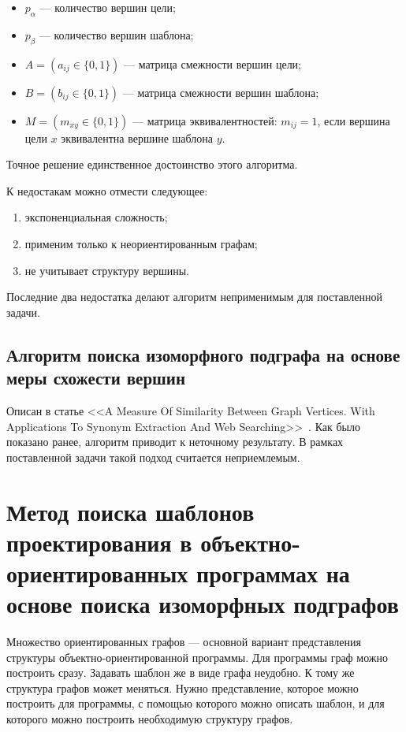 \begin{itemize}
\item $p_\alpha$ --- количество вершин цели;
\item $p_\beta$ --- количество вершин шаблона;
\item $A = (a_{ij} \in \{ 0, 1 \})$ --- матрица смежности вершин цели;
\item $B = (b_{ij} \in \{ 0, 1 \})$ --- матрица смежности вершин шаблона;
\item $M = (m_{xy} \in \{ 0, 1 \})$ --- матрица эквивалентностей: $m_{ij} = 1$,
если вершина цели $x$ эквивалентна вершине шаблона $y$.
\end{itemize}

Точное решение единственное достоинство этого алгоритма.

К недостакам можно отмести следующее:
\begin{enumerate}
\item экспоненциальная сложность;
\item применим только к неориентированным графам;
\item не учитывает структуру вершины.
\end{enumerate}

Последние два недостатка делают алгоритм неприменимым для поставленной задачи.

\subsection{Алгоритм поиска изоморфного подграфа на основе меры схожести вершин}

Описан в статье <<A Measure Of Similarity Between Graph Vertices.
With Applications To Synonym Extraction And Web Searching>>~\cite{SimilarityGraphVertices}.
Как было показано ранее, алгоритм приводит к неточному результату.
В рамках поставленной задачи такой подход считается неприемлемым.

\section{Метод поиска шаблонов проектирования в объектно-ориентированных программах на основе поиска изоморфных подграфов}

Множество ориентированных графов --- основной вариант представления структуры
объектно-ориентированной программы.
Для программы граф можно построить сразу.
Задавать шаблон же в виде графа неудобно.
К тому же структура графов может меняться.
Нужно представление, которое можно построить для программы,
с помощью которого можно описать шаблон, и для которого можно построить необходимую
структуру графов.


